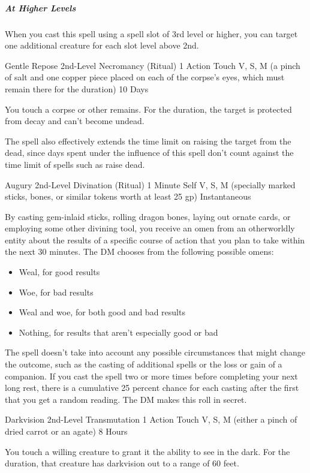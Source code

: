 {\subparagraph*{At Higher Levels} When you cast this spell using a spell slot of 3rd level or higher, you can target one additional creature for each slot level above 2nd.

\DndSpellHeader
  {Gentle Repose}
  {2nd-Level Necromancy (Ritual)}
  {1 Action}
  {Touch}
  {V, S, M (a pinch of salt and one copper piece placed on each of the corpse’s eyes, which must remain there for the duration)}
  {10 Days}

You touch a corpse or other remains. For the duration, the target is protected from decay and can’t become undead.

The spell also effectively extends the time limit on raising the target from the dead, since days spent under the influence of this spell don’t count against the time limit of spells such as raise dead.

\DndSpellHeader
  {Augury}
  {2nd-Level Divination (Ritual)}
  {1 Minute}
  {Self}
  {V, S, M (specially marked sticks, bones, or similar tokens worth at least 25 gp)}
  {Instantaneous}

By casting gem-inlaid sticks, rolling dragon bones, laying out ornate cards, or employing some other divining tool, you receive an omen from an otherworldly entity about the results of a specific course of action that you plan to take within the next 30 minutes. The DM chooses from the following possible omens:
\begin{itemize}
	\item Weal, for good results
	\item Woe, for bad results
	\item Weal and woe, for both good and bad results
	\item Nothing, for results that aren’t especially good or bad
\end{itemize}
The spell doesn’t take into account any possible circumstances that might change the outcome, such as the casting of additional spells or the loss or gain of a companion. If you cast the spell two or more times before completing your next long rest, there is a cumulative 25 percent chance for each casting after the first that you get a random reading. The DM makes this roll in secret.

\DndSpellHeader
  {Darkvision}
  {2nd-Level Transmutation}
  {1 Action}
  {Touch}
  {V, S, M (either a pinch of dried carrot or an agate)}
  {8 Hours}

You touch a willing creature to grant it the ability to see in the dark. For the duration, that creature has darkvision out to a range of 60 feet.

}
